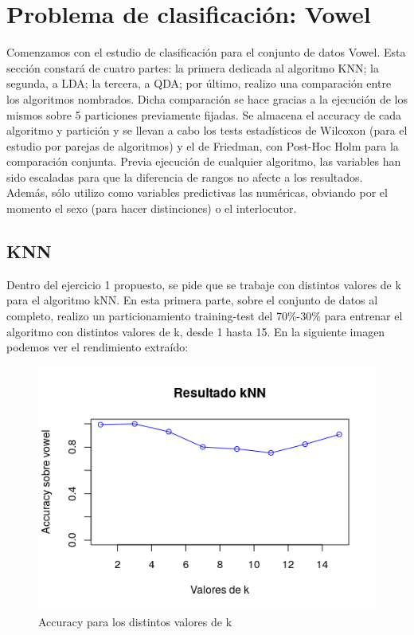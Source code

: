 \section{Problema de clasificación: Vowel}

Comenzamos con el estudio de clasificación para el conjunto de datos Vowel. Esta sección constará de cuatro partes: la primera dedicada al algoritmo KNN; la segunda, a LDA; la tercera, a QDA; por último, realizo una comparación entre los algoritmos nombrados. Dicha comparación se hace gracias a la ejecución de los mismos sobre 5 particiones previamente fijadas. Se almacena el accuracy de cada algoritmo y partición y se llevan a cabo los tests estadísticos de Wilcoxon (para el estudio por parejas de algoritmos) y el de Friedman, con Post-Hoc Holm para la comparación conjunta. Previa ejecución de cualquier algoritmo, las variables han sido escaladas para que la diferencia de rangos no afecte a los resultados. Además, sólo utilizo como variables predictivas las numéricas, obviando por el momento el sexo (para hacer distinciones) o el interlocutor.

\subsection{KNN}

Dentro del ejercicio 1 propuesto, se pide que se trabaje con distintos valores de k para el algoritmo kNN. En esta primera parte, sobre el conjunto de datos al completo, realizo un particionamiento training-test del 70\%-30\% para entrenar el algoritmo con distintos valores de k, desde 1 hasta 15. En la siguiente imagen podemos ver el rendimiento extraído:

\begin{figure}[H] %
	\centering
	\includegraphics[scale=0.8]{k-values.png}  %
	\caption{Accuracy para los distintos valores de k} 
	\label{fig:k-values}
\end{figure}

